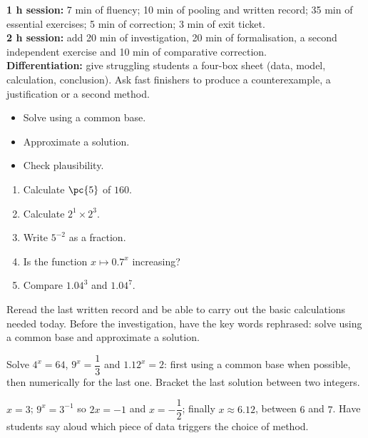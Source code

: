 \ifmxteacher
\begin{method}
\textbf{1 h session:} 7 min of fluency; 10 min of pooling and written record; 35 min of essential exercises; 5 min of correction; 3 min of exit ticket.\\
\textbf{2 h session:} add 20 min of investigation, 20 min of formalisation, a second independent exercise and 10 min of comparative correction.\\
\textbf{Differentiation:} give struggling students a four-box sheet (data, model, calculation, conclusion). Ask fast finishers to produce a counterexample, a justification or a second method.
\end{method}
\fi
{}
\begin{objectives}\begin{itemize}\item Solve using a common base.\item Approximate a solution.\item Check plausibility.\end{itemize}\end{objectives}
\begin{fluency}\begin{enumerate}\item Calculate $\pc{5}$ of $160$. \item Calculate $2^1\times2^3$. \item Write $5^{-2}$ as a fraction. \item Is the function $x\mapsto\num{0,7}^x$ increasing? \item Compare $\num{1,04}^3$ and $\num{1,04}^7$. \end{enumerate}\end{fluency}
\begin{prerequisites}Reread the last written record and be able to carry out the basic calculations needed today. Before the investigation, have the key words rephrased: solve using a common base and approximate a solution.\end{prerequisites}

\begin{activity}
Solve $4^x=64$, $9^x=\dfrac13$ and $\num{1,12}^x=2$: first using a common base when possible, then numerically for the last one. Bracket the last solution between two integers.

\end{activity}
\begin{solution}$x=3$; $9^x=3^{-1}$ so $2x=-1$ and $x=-\dfrac12$; finally $x\approx\num{6,12}$, between $6$ and $7$. Have students say aloud which piece of data triggers the choice of method.\end{solution}

